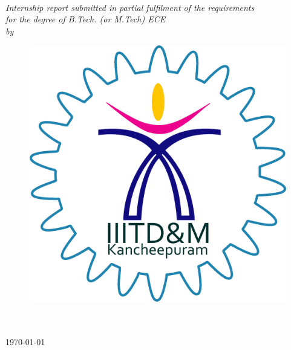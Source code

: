 \documentclass[11pt, a4paper, oneside]{Thesis} %
\begin{document}
\begin{titlepage}
\begin{center}


\vspace{0.4cm} %
{\huge \bfseries \ttitle}\\[0.4cm] %
\vspace{1.5cm} %

 
 \large \textit{Internship report submitted in partial fulfilment of the requirements\\ for the degree of B.Tech. (or M.Tech) ECE}\\[0.3cm] %
\textit{by}\\[0.4cm]

\authornames

\vfill
\graphicspath{ {./Figures/} }
\begin{figure}[hb]
  \centering
  \includegraphics[width=0.35\linewidth]{iiitdm.png}
\end{figure}

\DEPTNAME\\ %
\textsc{ \UNIVNAME}\\[1.5cm] %
\large \today\\[2cm] %


\end{center}

\end{titlepage}

\end{document}
